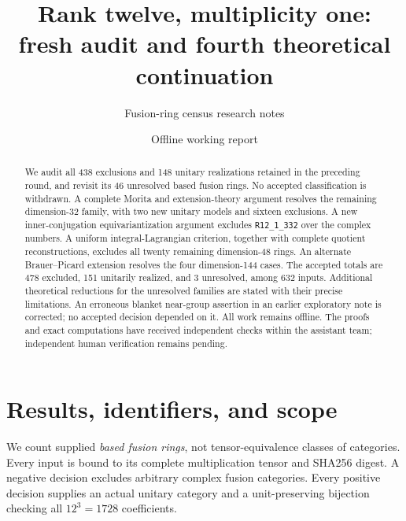\documentclass[11pt]{article}
\title{Rank twelve, multiplicity one:\\fresh audit and fourth theoretical continuation}
\author{Fusion-ring census research notes}
\date{Offline working report}
\newcommand{\R}[1]{\texttt{R12\_1\_#1}}
\begin{document}
\maketitle
\begin{abstract}
We audit all 438 exclusions and 148 unitary realizations retained in the
preceding round, and revisit its 46 unresolved based fusion rings. No
accepted classification is withdrawn. A complete Morita and extension-theory
argument resolves the remaining dimension-32 family, with two new unitary
models and sixteen exclusions. A new inner-conjugation equivariantization
argument excludes \R{332} over the complex numbers. A uniform integral-Lagrangian
criterion, together with complete quotient reconstructions, excludes all twenty
remaining dimension-48 rings. An alternate Brauer--Picard extension resolves
the four dimension-144 cases. The accepted totals are
478 excluded, 151 unitarily realized, and 3 unresolved, among 632 inputs.
Additional theoretical reductions for the unresolved families are stated
with their precise limitations. An erroneous blanket near-group assertion
in an earlier exploratory note is corrected; no accepted decision depended
on it. All work remains offline. The proofs and exact computations have
received independent checks within the assistant team; independent human
verification remains pending.
\end{abstract}

\section{Results, identifiers, and scope}
We count supplied \emph{based fusion rings}, not tensor-equivalence classes
of categories. Every input is bound to its complete multiplication tensor
and SHA256 digest. A negative decision excludes arbitrary complex fusion
categories. Every positive decision supplies an actual unitary category
and a unit-preserving bijection checking all $12^3=1728$ coefficients.
\end{document}
